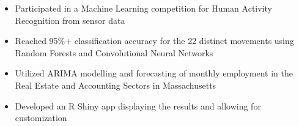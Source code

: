 
\begin{itemize}
    \item Participated in a Machine Learning competition for Human Activity Recognition from sensor data
    \item Reached 95\%+ classification accuracy for the 22 distinct movements using Random Forests and Convolutional Neural Networks
\end{itemize}

\divider

\begin{itemize}
    \item Utilized ARIMA modelling and forecasting of monthly employment in the Real Estate and Accounting Sectors in Massachusetts
    \item Developed an R Shiny app displaying the results and allowing for customization
\end{itemize}





\medskip


\newline \vspace{6px}

